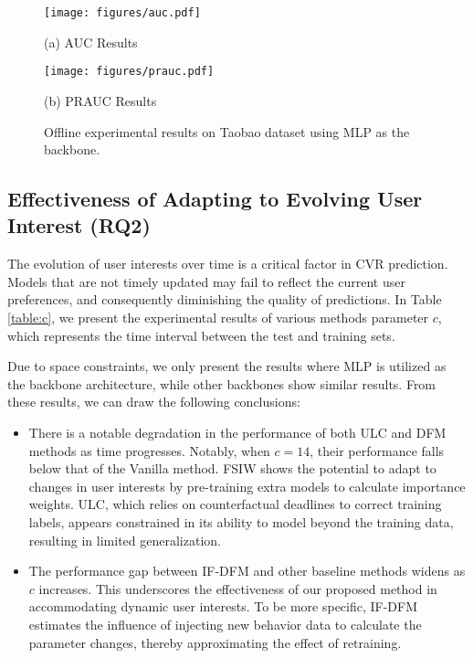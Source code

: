 \begin{figure}[t]
  \centering
  \begin{minipage}[b]{0.225\textwidth}
    \centering
\texttt{[image: figures/auc.pdf]}
\vspace{-10pt}
    \caption*{(a) AUC Results}
  \end{minipage}
  \begin{minipage}[b]{0.225\textwidth}
    \centering
\texttt{[image: figures/prauc.pdf]}
    \caption*{(b) PRAUC Results}
  \end{minipage}
  \vspace{-10pt}
  \caption{Offline experimental results on Taobao dataset using MLP as the backbone.}
  \label{fig:both_images}
  \vspace{-15pt}
\end{figure}

\subsection{Effectiveness of Adapting to Evolving User Interest (RQ2)}
The evolution of user interests over time is a critical factor in CVR prediction. Models that are not timely updated may fail to reflect the current user preferences, and consequently diminishing the quality of predictions.
In Table \ref{table:c}, we present the experimental results of various methods \wrt parameter $c$, which represents the time interval between the test and training sets. 

Due to space constraints, we only present the results where MLP is utilized as the backbone architecture, while other backbones show similar results. From these results, we can draw the following conclusions:
\begin{itemize}[leftmargin=*]
    \item There is a notable degradation in the performance of both ULC and DFM methods as time progresses. Notably, when $c=14$, their performance falls below that of the Vanilla method.
    FSIW shows the potential to adapt to changes in user interests by pre-training extra models to calculate importance weights. ULC, which relies on counterfactual deadlines to correct training labels, appears constrained in its ability to model beyond the training data, resulting in limited generalization.
     \item 
     The performance gap between IF-DFM and other baseline methods widens as $c$ increases. This underscores the effectiveness of our proposed method in accommodating dynamic user interests.
     To be more specific, IF-DFM estimates the influence of injecting new behavior data to calculate the parameter changes, thereby approximating the effect of retraining.
\end{itemize}

